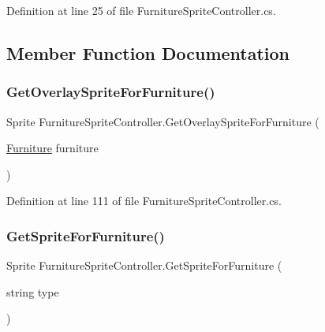 Definition at line 25 of file Furniture\+Sprite\+Controller.\+cs.



\subsection{Member Function Documentation}
\mbox{\label{class_furniture_sprite_controller_ac9a9b01afdd77238e8dcab98d2b7d877}} 
\subsubsection{\texorpdfstring{Get\+Overlay\+Sprite\+For\+Furniture()}{GetOverlaySpriteForFurniture()}}
{\footnotesize\ttfamily Sprite Furniture\+Sprite\+Controller.\+Get\+Overlay\+Sprite\+For\+Furniture (\begin{DoxyParamCaption}\item[{\hyperlink{class_furniture}{Furniture}}]{furniture }\end{DoxyParamCaption})}



Definition at line 111 of file Furniture\+Sprite\+Controller.\+cs.

\mbox{\label{class_furniture_sprite_controller_a28c4198ec62f455ece7489a0c40b9cc9}} 
\subsubsection{\texorpdfstring{Get\+Sprite\+For\+Furniture()}{GetSpriteForFurniture()}\hspace{0.1cm}{\footnotesize\ttfamily [1/2]}}
{\footnotesize\ttfamily Sprite Furniture\+Sprite\+Controller.\+Get\+Sprite\+For\+Furniture (\begin{DoxyParamCaption}\item[{string}]{type }\end{DoxyParamCaption})}



